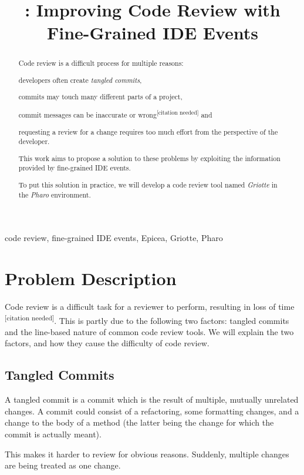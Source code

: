\documentclass[conference,a4paper]{IEEEtran}
\title{\Gr{}: Improving Code Review with Fine-Grained IDE Events}
\author{\IEEEauthorblockN{Skip~Lentz}\IEEEauthorblockA{EEMCS\\Delft
    University of Technology} \and
  \IEEEauthorblockN{Mart\'{i}n~Dias}\IEEEauthorblockA{RMoD\\INRIA
    Lille-Nord Europe}}
\newcommand{\citeneeded}{\textsuperscript{{[}citation needed{]}}}
\newcommand{\TC}{tangled commit}
\newcommand{\Ep}{Epicea}
\newcommand{\Gr}{Griotte}
\begin{document}
\maketitle{}
\begin{abstract}
  Code review is a difficult process for multiple reasons:
  \begin{enumerate*}
  \item developers often create \textit{tangled commits},
  \item commits may touch many different parts of a project,
  \item commit messages can be inaccurate or wrong\citeneeded{} and
  \item requesting a review for a change requires too much effort from
    the perspective of the developer.
  \end{enumerate*}

  This work aims to propose a solution to these problems by exploiting
  the information provided by fine-grained IDE events.

  To put this solution in practice, we will develop a code review tool
  named \textit{\Gr} in the \textit{Pharo} environment.
\end{abstract}
\begin{IEEEkeywords}
  code review, fine-grained IDE events, \Ep, \Gr, Pharo
\end{IEEEkeywords}

\section{Problem Description}
\label{sec:problem-description}
Code review is a difficult task for a reviewer to perform, resulting
in loss of time \citeneeded{}. This is partly due to the following two
factors: \TC{}s and the line-based nature of common code review
tools. We will explain the two factors, and how they cause the
difficulty of code review.

\subsection{Tangled Commits}
\label{sec:tangled-commits}
A \TC{} is a commit which is the result of multiple, mutually
unrelated changes. A commit could consist of a refactoring, some
formatting changes, and a change to the body of a method (the latter
being the change for which the commit is actually meant).

This makes it harder to review for obvious reasons. Suddenly, multiple
changes are being treated as one change.
\end{document}
